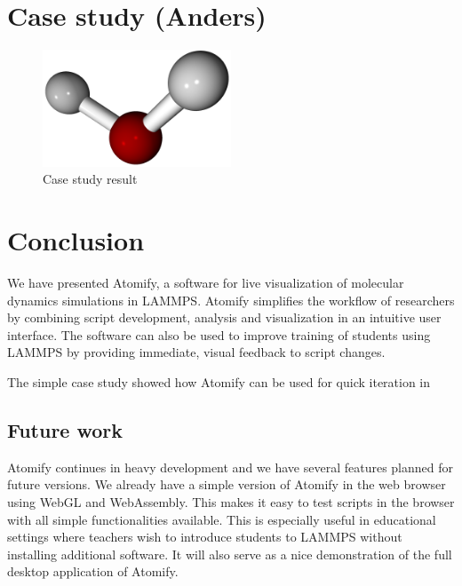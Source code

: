 \documentclass[aps,pre,twocolumn,letterpaper,floatfix,nofootinbib]{revtex4}
\begin{document}


\section{Case study (Anders)}


\begin{figure}
	\centering
	\includegraphics[width=0.5\textwidth]{final_billboard.png}
	\caption{Case study result}
	\label{fig:gui}
\end{figure}

\section{Conclusion}
%
We have presented Atomify, a software for live visualization of molecular
dynamics simulations in LAMMPS.
Atomify simplifies the workflow of researchers by combining script development,
analysis and visualization in an intuitive user interface.
The software can also be used to improve training of students using LAMMPS by
providing immediate, visual feedback to script changes.

The simple case study showed how Atomify can be used for quick iteration in 

\subsection{Future work}

Atomify continues in heavy development and we have several features planned for
future versions.
We already have a simple version of Atomify in the web browser using WebGL and WebAssembly.
This makes it easy to test scripts in the browser with all simple functionalities available.
This is especially useful in educational settings where teachers wish to introduce students
to LAMMPS without installing additional software.
It will also serve as a nice demonstration of the full desktop application of
Atomify.
\end{document}
